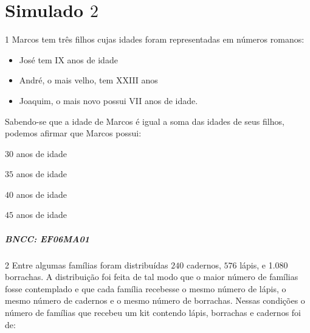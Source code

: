 {\chapter{Simulado $2$}

\num{1}  Marcos tem três filhos cujas idades foram representadas em números
romanos:

\begin{itemize}
\item
  José tem IX anos de idade
\item
  André, o mais velho, tem XXIII anos
\item
  Joaquim, o mais novo possui VII anos de idade.
\end{itemize}

Sabendo-se que a idade de Marcos é igual a soma das idades de seus
filhos, podemos afirmar que Marcos possui:

\begin{escolha}
\item $30$ anos de idade
\item $35$ anos de idade
\item $40$ anos de idade
\item $45$ anos de idade
\end{escolha}

\paragraph{BNCC: EF06MA01 }


\num{2}  Entre algumas famílias foram distribuídas $240$ cadernos, $576$ lápis, e
1.080 borrachas. A distribuição foi feita de tal modo que o maior número
de famílias fosse contemplado e que cada família recebesse o mesmo
número de lápis, o mesmo número de cadernos e o mesmo número de
borrachas. Nessas condições o número de famílias que recebeu um kit
contendo lápis, borrachas e cadernos foi de:

}
